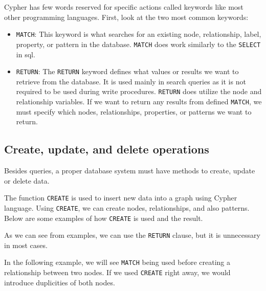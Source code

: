 Cypher has few words reserved for specific actions called keywords like most other programming languages. \cite{noauthor_querying_nodate}
First, look at the two most common keywords:
\begin{itemize}
    \item {\texttt{MATCH}: This keyword is what searches for an existing node, relationship, label, property, or pattern in the database. \texttt{MATCH} does work similarly to the \texttt{SELECT} in \acrshort{sql}.}
    \item {\texttt{RETURN}: The \texttt{RETURN} keyword defines what values or results we want to retrieve from the database.
          It is used mainly in search queries as it is not required to be used during write procedures.
          \texttt{RETURN} does utilize the node and relationship variables. If we want to return any results from defined \texttt{MATCH},
          we must specify which nodes, relationships, properties, or patterns we want to return.}
\end{itemize}

\subsection{Create, update, and delete operations}

Besides queries, a proper database system must have methods to create, update or delete data.

The function \texttt{CREATE} is used to insert new data into a graph using Cypher language.
Using \texttt{CREATE}, we can create nodes, relationships, and also patterns. Below are some examples of how \texttt{CREATE} is used and the result. \cite{noauthor_updating_nodate}


As we can see from examples, we can use the \texttt{RETURN} clause, but it is unnecessary in most cases.

In the following example, we will see \texttt{MATCH} being used before creating a relationship between two nodes.
If we used \texttt{CREATE} right away, we would introduce duplicities of both nodes.

